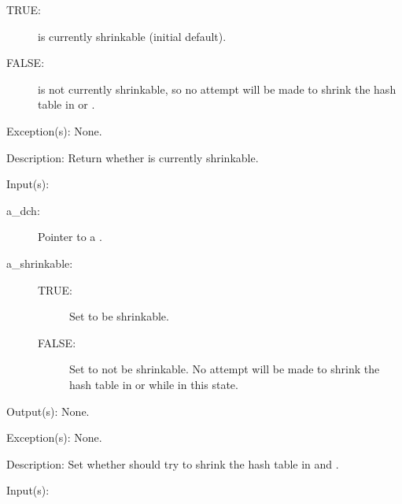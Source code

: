 \begin{capi}
\begin{capilist}
\begin{description}
\begin{description}
			\item[TRUE: ]  is currently shrinkable
				(initial default).
			\item[FALSE: ]  is not currently
				shrinkable, so no attempt will be made to shrink
				the hash table in  or
				.
			\end{description}
		\end{description}
	\item[Exception(s): ] None.
	\item[Description: ]
		Return whether  is currently shrinkable.
	\end{capilist}
\label{dch_shrinkable_set}
	\begin{capilist}
	\item[Input(s): ]
		\begin{description}\item[]
		\item[a\_dch: ]
			Pointer to a .
		\item[a\_shrinkable: ]
			\begin{description}\item[]
			\item[TRUE: ] Set  to be shrinkable.
			\item[FALSE: ] Set  to not be shrinkable.
				No attempt will be made to shrink the hash table
				in  or
				 while in this
				state.
			\end{description}
		\end{description}
	\item[Output(s): ] None.
	\item[Exception(s): ] None.
	\item[Description: ]
		Set whether  should try to shrink the hash table in
		 and .
	\end{capilist}
\label{dch_insert}
	\begin{capilist}
	\item[Input(s): ]
		\begin{description}\item[]

\end{description}
\end{capilist}
\end{capi}
